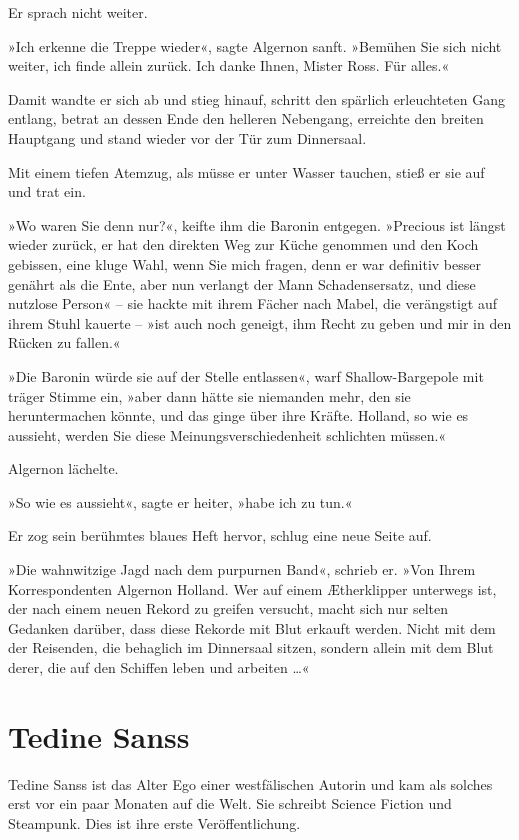 Er sprach nicht weiter.

»Ich erkenne die Treppe wieder«, sagte Algernon sanft. »Bemühen Sie
sich nicht weiter, ich finde allein zurück. Ich danke Ihnen, Mister
Ross. Für alles.«

Damit wandte er sich ab und stieg hinauf, schritt den spärlich
erleuchteten Gang entlang, betrat an dessen Ende den helleren
Nebengang, erreichte den breiten Hauptgang und stand wieder vor der
Tür zum Dinnersaal.

Mit einem tiefen Atemzug, als müsse er unter Wasser tauchen, stieß
er sie auf und trat ein.

\tb

»Wo waren Sie denn nur?«, keifte ihm die Baronin entgegen.
»Precious ist längst wieder zurück, er hat den direkten Weg zur
Küche genommen und den Koch gebissen, eine kluge Wahl, wenn Sie
mich fragen, denn er war definitiv besser genährt als die Ente,
aber nun verlangt der Mann Schadensersatz, und diese nutzlose
Person« – sie hackte mit ihrem Fächer nach Mabel, die verängstigt
auf ihrem Stuhl kauerte – »ist auch noch geneigt, ihm Recht zu
geben und mir in den Rücken zu fallen.«

»Die Baronin würde sie auf der Stelle entlassen«, warf
Shallow-Bargepole mit träger Stimme ein, »aber dann hätte sie
niemanden mehr, den sie heruntermachen könnte, und das ginge über
ihre Kräfte. Holland, so wie es aussieht, werden Sie diese
Meinungsverschiedenheit schlichten müssen.«

\bigpar

Algernon lächelte.

\bigpar

»So wie es aussieht«, sagte er heiter, »habe ich zu tun.«

Er zog sein berühmtes blaues Heft hervor, schlug eine neue Seite
auf.

»Die wahnwitzige Jagd nach dem purpurnen Band«, schrieb er. »Von
Ihrem Korrespondenten Algernon Holland. Wer auf einem Ætherklipper
unterwegs ist, der nach einem neuen Rekord zu greifen versucht,
macht sich nur selten Gedanken darüber, dass diese Rekorde mit Blut
erkauft werden. Nicht mit dem der Reisenden, die behaglich im
Dinnersaal sitzen, sondern allein mit dem Blut derer, die auf den
Schiffen leben und arbeiten \ldots{}«


\section{Tedine Sanss}

Tedine Sanss ist das Alter Ego einer westfälischen Autorin und kam
als solches erst vor ein paar Monaten auf die Welt. Sie schreibt
Science Fiction und Steampunk. Dies ist ihre erste
Veröffentlichung.

